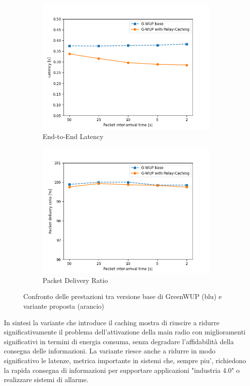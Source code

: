 \begin{figure}[H]
\begin{subfigure}[t]{0.49\linewidth}
    \includegraphics[width=1.1\linewidth]{Contents/Images/graphs/relayCaching/latency.png}
    \caption{End-to-End Latency}
    \label{fig:Latency_2}
  \end{subfigure}
  \begin{subfigure}[t]{0.49\linewidth}
    \includegraphics[width=1.1\linewidth]{Contents/Images/graphs/relayCaching/pdr.png}
    \caption{Packet Delivery Ratio}
    \label{fig:PDR_2}
  \end{subfigure}
  \caption{Confronto delle prestazioni tra versione base di GreenWUP (blu) e variante proposta (arancio)}
  \label{fig:relayCaching}
\end{figure}

In sintesi la variante che introduce il caching mostra di riuscire a ridurre significativamente il problema dell'attivazione della main radio con miglioramenti significativi in termini di energia consuma, senza degradare l'affidabilità della consegna delle informazioni. La variante riesce anche a ridurre in modo significativo le latenze, metrica importante in sistemi che, sempre piu', richiedono la rapida consegna di informazioni per supportare applicazioni "industria 4.0" o realizzare sistemi di allarme.